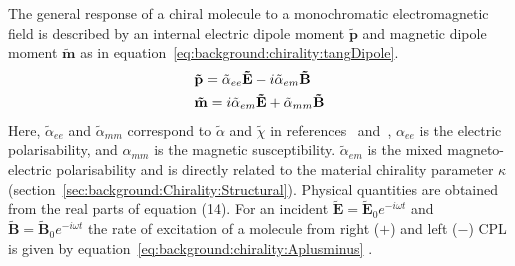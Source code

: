 The general response of a chiral molecule to a monochromatic electromagnetic field is described by an internal electric dipole moment $\mathbf{\tilde p}$ and magnetic dipole moment $\mathbf{\tilde m}$ as in equation~\ref{eq:background:chirality:tangDipole}.
\begin{equation}
    \label{eq:background:chirality:tangDipole}
    \begin{split}
        &{\bf{\tilde p}} = {{\tilde \alpha }_{ee}}{\bf{\tilde E}} - i{{\tilde \alpha }_{em}}{\bf{\tilde B}} \\
        &{\bf{\tilde m}} = i{{\tilde \alpha }_{em}}{\bf{\tilde E}} + {{\tilde \alpha }_{mm}}{\bf{\tilde B}}
    \end{split}
\end{equation}
Here, $\tilde{\alpha}_{ee}$ and $\tilde{\alpha}_{mm}$ correspond to $\tilde{\alpha}$ and $\tilde{\chi}$ in references~\cite{Tang2010} and~\cite{Choi2012}, 
$\alpha_{ee}$ is the electric polarisability, and $\alpha_{mm}$ is the magnetic susceptibility. $\tilde{\alpha}_{em}$ is the mixed magneto-electric polarisability and is directly related to the material chirality parameter $\kappa$ (section~\ref{sec:background:Chirality:Structural}).
Physical quantities are obtained from the real parts of equation (14). For an incident $\mathbf{\tilde{E}}=\mathbf{\tilde{E}}_{0}{e}^{-i\omega t}$ and $\mathbf{\tilde{B}}=\mathbf{\tilde{B}}_{0}{e}^{-i\omega t}$ the rate of excitation of a molecule from right ($+$) and left ($-$) CPL is given by equation~\ref{eq:background:chirality:Aplusminus} \cite{Tang2010, Choi2012}.

